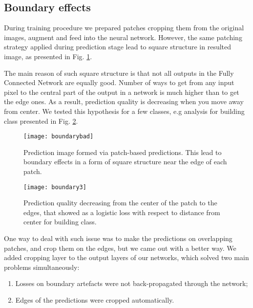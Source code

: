 \documentclass[10pt,twocolumn,letterpaper]{article}
\begin{document}
\subsection{Boundary effects}

During training procedure we prepared patches cropping them from the original images, augment and feed into the neural network. However, the same patching strategy applied during prediction stage lead to square structure in resulted image, as presented in Fig. \ref{fig:boundarybad}. 

The main reason of such square structure is that not all outputs in the Fully Connected Network are equally good. Number of ways to get from any input pixel to the central part of the output in a network is much higher than to get the edge ones. As a result, prediction quality is decreasing when you move away from center. We tested this hypothesis for a few classes, e.g analysis for building class presented in Fig. \ref{fig:boundary}.

\begin{figure}[!h]
	\captionsetup{justification=centering}
	\centering
	\texttt{[image: boundarybad]}
	\caption{Prediction image formed via patch-based predictions. This lead to boundary effects in a form of square structure near the edge of each patch.}
	\label{fig:boundarybad}
\end{figure}

\begin{figure}[!h]
	\captionsetup{justification=centering}
	\centering
	\texttt{[image: boundary3]}
	\caption{Prediction quality decreasing from the center of the patch to the edges, that showed as a logistic loss with respect to distance from center for building class.}
	\label{fig:boundary}
\end{figure}

One way to deal with such issue was to make the predictions on overlapping patches, and crop them on the edges, but we came out with a better way. We added cropping layer to the output layers of our networks, which solved two main problems simultaneously:

\begin{enumerate}
	\item Losses on boundary artefacts were not back-propagated through the network;
	\item Edges of the predictions were cropped automatically.
\end{enumerate}
\end{document}
